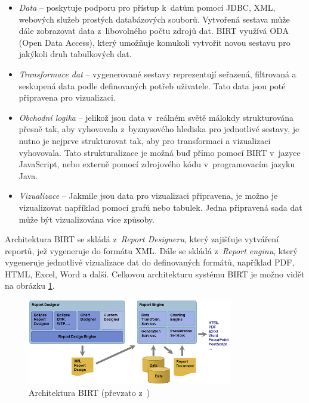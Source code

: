 \documentclass[czech,master]{diploma}
\begin{document}
\begin{itemize}
\item \textit{Data} -- poskytuje podporu pro přístup k~datům pomocí JDBC, XML, webových služeb prostých databázových souborů. Vytvořená sestava může dále zobrazovat data z~libovolného počtu zdrojů dat. BIRT využívá ODA (Open Data Access), který umožňuje komukoli vytvořit novou sestavu pro jakýkoli druh tabulkových dat.
\item \textit{Transformace dat} -- vygenerované sestavy reprezentují seřazená, filtrovaná a seskupená data podle definovaných potřeb uživatele. Tato data jsou poté připravena pro vizualizaci.
\item \textit{Obchodní logika} -- jelikož jsou data v~reálném světě málokdy strukturována přesně tak, aby vyhovovala z~byznysového hlediska pro jednotlivé sestavy, je nutno je nejprve strukturovat tak, aby pro transformaci a vizualizaci vyhovovala. Tato strukturalizace je možná buď přímo pomocí BIRT v~jazyce JavaScript, nebo externě pomocí zdrojového kódu v~programovacím jazyku Java.

\item \textit{Vizualizace} -- Jakmile jsou data pro vizualizaci připravena, je možno je vizualizovat například pomocí grafů nebo tabulek. Jedna připravená sada dat může být vizualizována více způsoby.
\end{itemize}

Architektura BIRT se skládá z~\textit{Report Designeru}, který zajišťuje vytváření reportů, jež vygeneruje do formátu XML. Dále se skládá z~\textit{Report enginu}, který vygeneruje jednotlivé vizualizace dat do definovaných formátů, například PDF, HTML, Excel, Word a další. Celkovou architekturu systému BIRT je možno vidět na obrázku \ref{fig:birtarch}.

\begin{figure}[!ht]
    \centering
    \includegraphics[width=0.8\textwidth]{Diplomka/Figures/birtarch.png}
    \caption{Architektura BIRT (převzato z~\cite{ref:birt_about})}
    \label{fig:birtarch}
\end{figure}
\end{document}
